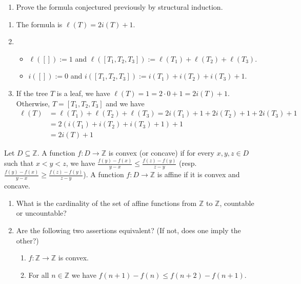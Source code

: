 \documentclass[a4paper,11pt]{exam}
\newcommand{\Z}{\mathbb{Z}}
\begin{document}
\begin{questions}
\begin{enumerate}
			\item Prove the formula conjectured previously by structural induction.
		\end{enumerate}
		
		\begin{solution}
			\begin{enumerate}
				\item The formula is $\ell(T) = 2i(T)+1$. 
				\item 
				\begin{itemize}
					\item $\ell([]) := 1$ and $\ell([T_1,T_2,T_3]) := \ell(T_1) + \ell(T_2) + \ell(T_3)$.
					\item $i([]) := 0$ and $i([T_1,T_2,T_3]) := i(T_1) + i(T_2) + i(T_3) + 1$.
				\end{itemize}
				\item If the tree $ T $ is a leaf, we have $\ell (T) = 1 = 2 \cdot 0 + 1 = 2i (T) + 1 $. Otherwise, $ T = [T_1, T_2, T_3] $ and we have
				\begin{align*}
				\ell(T) & = \ell(T_1) + \ell(T_2) + \ell(T_3) = 2i(T_1) + 1 + 2i(T_2) + 1 + 2i(T_3) + 1\\
				& = 2(i(T_1) + i(T_2) + i(T_3) + 1) +1\\
				& = 2i(T) +1
				\end{align*}
			\end{enumerate}
		\end{solution}
		
		
		\question
		Let $ D \subseteq \Z $. A function $ f: D \to \Z $ is convex (or concave) if for every $ x, y, z \in D $ such that $ x <y <z $, we have $ \frac{f (y ) - f (x)}{y - x} \leq \frac{f (z) - f (y)}{z-y} $ (resp. $ \frac{f (y) - f (x)}{y - x} \geq \frac{f (z) - f (y)}{z-y} $). A function $ f: D \to\Z $ is affine if it is convex and concave.
		
		\begin{enumerate}
			\item What is the cardinality of the set of affine functions from $ \Z $ to $ \Z $, countable or uncountable?
			\item  Are the following two assertions equivalent? (If not, does one imply the other?)
			\begin{enumerate}
				\item $f : \Z \to \Z$ is convex.
				\item For all $n \in \Z$ we have $f(n+1) -f(n) \leq f(n+2)-f(n+1)$.
			\end{enumerate}
			

\end{enumerate}
\end{questions}
\end{document}
